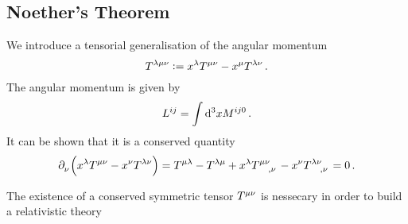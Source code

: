 \subsection{Noether's Theorem}
We introduce a tensorial generalisation of the angular momentum
\begin{equation}
    \tensor{T}{^\lambda^\mu^\nu}:=
    \tensor{x}{^\lambda}\tensor{T}{^\mu^\nu}-\tensor{x}{^\mu}\tensor{T}{^\lambda^\nu}\,
    .
\end{equation}
The angular momentum is given by
\begin{equation}
    \tensor{L}{^i^j} = \int\dif{}^3 x \tensor{M}{^i^j^0}\, .
\end{equation}
It can be shown that it is a conserved quantity
\begin{equation}
    \tensor{\partial}{_\nu}\left(\tensor{x}{^\lambda}\tensor{T}{^\mu^\nu}-\tensor{x}{^\nu}\tensor{T}{^\lambda^\nu}\right)
    =\tensor{T}{^\mu^\lambda}-\tensor{T}{^\lambda^\mu}+\tensor{x}{^\lambda}
    \tensor{T}{^\mu^\nu_,_\nu}-\tensor{x}{^\nu}\tensor{T}{^\lambda^\nu_,_\nu}=0\, .
\end{equation}
\begin{remark}
The existence of a conserved symmetric tensor $\tensor{T}{^\mu^\nu}$ is
nessecary in order to build a relativistic theory
\end{remark}
